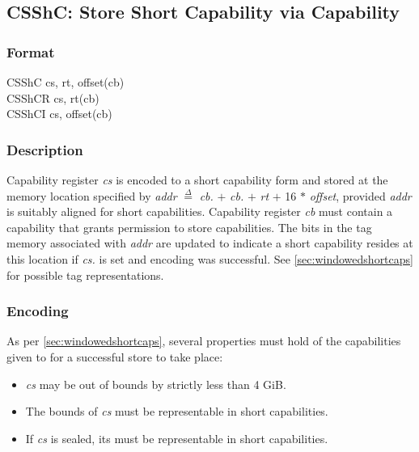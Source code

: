 \clearpage
{}
{}
\subsection*{CSShC: Store Short Capability via Capability}

\subsubsection*{Format}

CSShC cs, rt, offset(cb) \\
CSShCR cs, rt(cb) \\
CSShCI cs, offset(cb)


\subsubsection*{Description}

Capability register \emph{cs} is encoded to a short capability form and
stored at the memory location specified by
%
\emph{addr} $\stackrel{\Delta}{=}$ \emph{cb.\cbase{}} $+$ \emph{cb.\coffset{}} $+$ \emph{rt} $+$ 16 $*$
\emph{offset},
%
provided \emph{addr} is suitably aligned for short capabilities.
%
Capability register \emph{cb} must contain a capability that grants
permission to store capabilities.
%
The bits in the tag memory associated with \emph{addr} are updated to
indicate a short capability resides at this location if \emph{cs.\ctag{}} is
set and encoding was successful.  See \cref{sec:windowedshortcaps} for
possible tag representations.

\subsubsection*{Encoding}

As per \cref{sec:windowedshortcaps}, several properties must hold of the
capabilities given to  for a successful store to take
place:

\begin{itemize}
  \item \emph{cs} may be out of bounds by strictly less than 4 GiB.
  \item The bounds of \emph{cs} must be representable in short capabilities.
  \item If \emph{cs} is sealed, its \cotype{} must be representable in short
        capabilities.
\end{itemize}

